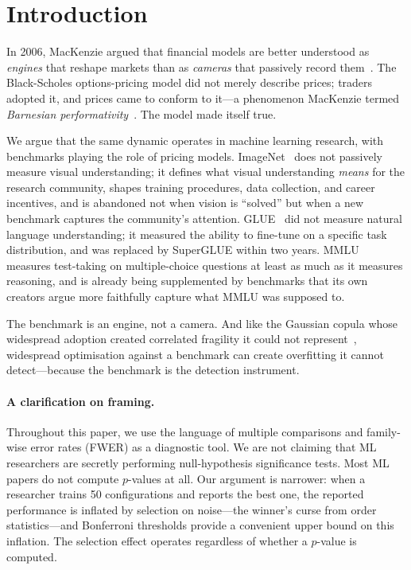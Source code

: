 \documentclass{article}
\begin{document}
\section{Introduction}
\label{sec:intro}

In 2006, MacKenzie argued that financial models are better understood as \textit{engines} that reshape markets than as \textit{cameras} that passively record them~\citep{mackenzie_engine_2006}. The Black-Scholes options-pricing model did not merely describe prices; traders adopted it, and prices came to conform to it---a phenomenon MacKenzie termed \textit{Barnesian performativity}~\citep{mackenzie_millo_2003}. The model made itself true.

We argue that the same dynamic operates in machine learning research, with benchmarks playing the role of pricing models. ImageNet~\citep{deng_imagenet_2009} does not passively measure visual understanding; it defines what visual understanding \textit{means} for the research community, shapes training procedures, data collection, and career incentives, and is abandoned not when vision is ``solved'' but when a new benchmark captures the community's attention. GLUE~\citep{wang_glue_2018} did not measure natural language understanding; it measured the ability to fine-tune on a specific task distribution, and was replaced by SuperGLUE within two years. MMLU~\citep{hendrycks_mmlu_2021} measures test-taking on multiple-choice questions at least as much as it measures reasoning, and is already being supplemented by benchmarks that its own creators argue more faithfully capture what MMLU was supposed to.

The benchmark is an engine, not a camera. And like the Gaussian copula whose widespread adoption created correlated fragility it could not represent~\citep{mackenzie_bamford_2018}, widespread optimisation against a benchmark can create overfitting it cannot detect---because the benchmark is the detection instrument.

\paragraph{A clarification on framing.} Throughout this paper, we use the language of multiple comparisons and family-wise error rates (FWER) as a diagnostic tool. We are not claiming that ML researchers are secretly performing null-hypothesis significance tests. Most ML papers do not compute $p$-values at all. Our argument is narrower: when a researcher trains 50 configurations and reports the best one, the reported performance is inflated by selection on noise---the winner's curse from order statistics---and Bonferroni thresholds provide a convenient upper bound on this inflation. The selection effect operates regardless of whether a $p$-value is computed.
\end{document}
